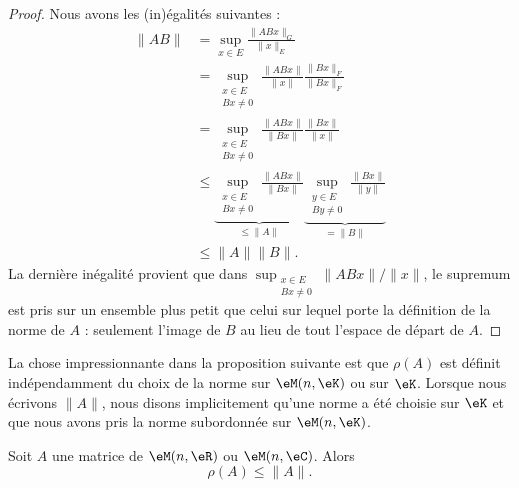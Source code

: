 \begin{proof}
    
    Nous avons les (in)égalités suivantes :
    \begin{subequations}
        \begin{align}
            \| AB \|&=\sup_{x\in E}\frac{ \| ABx \|_G }{ \| x \|_E }\\
            &=\sup_{\substack{x\in E\\Bx\neq 0}}\frac{ \| ABx \| }{ \| x \| }\frac{ \| Bx \|_F }{ \| Bx \|_F }\\
            &=\sup_{\substack{x\in E\\Bx\neq 0}}\frac{ \| ABx \| }{ \| Bx \| }\frac{ \| Bx \| }{ \| x \| }\\
            &\leq\underbrace{\sup_{\substack{x\in E\\Bx\neq 0}}\frac{ \| ABx \| }{ \| Bx \| }}_{\leq\| A \|}\underbrace{\sup_{\substack{y\in E\\By\neq 0}}\frac{ \| Bx \| }{ \| y \| }}_{=\| B \|}\\
            &\leq \| A \|\| B \|.
        \end{align}
    \end{subequations}
    La dernière inégalité provient que dans \( \sup_{\substack{x\in E\\Bx\neq 0}}\| ABx \|/\| x \|\), le supremum est pris sur un ensemble plus petit que celui sur lequel porte la définition de la norme de \( A\) : seulement l'image de \( B\) au lieu de tout l'espace de départ de \( A\).
\end{proof}

La chose impressionnante dans la proposition suivante est que \( \rho(A)\) est définit indépendamment du choix de la norme sur \( \eM(n,\eK)\) ou sur \( \eK\). Lorsque nous écrivons \( \| A \|\), nous disons implicitement qu'une norme a été choisie sur \( \eK\) et que nous avons pris la norme subordonnée sur \( \eM(n,\eK)\).
\begin{proposition}      \label{PROPooWZJBooTPLSZp}
    Soit \( A\) une matrice de \( \eM(n,\eR)\) ou \( \eM(n,\eC)\). Alors 
    \begin{equation}
        \rho(A)\leq \| A \|.
    \end{equation}
\end{proposition}

